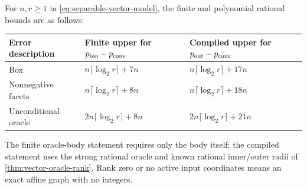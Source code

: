 \begin{theorem}\label{thm:separable-vector-rank}
For $n,r\ge1$ in \eqref{eq:separable-vector-model}, the finite and
polynomial rational bounds are as follows:
\begin{center}
\begin{tabular}{lll}
\toprule
Error description & Finite upper for $p_{\mathrm{bin}}-p_{\mathrm{conv}}$ & Compiled upper for $p_{\mathrm{out}}-p_{\mathrm{conv}}$\\
\midrule
Box & $n\lceil\log_2r\rceil+7n$ & $n\lceil\log_2r\rceil+17n$\\
Nonnegative facets & $n\lceil\log_2r\rceil+8n$ & $n\lceil\log_2r\rceil+18n$\\
Unconditional oracle & $2n\lceil\log_2r\rceil+8n$ & $2n\lceil\log_2r\rceil+21n$\\
\bottomrule
\end{tabular}
\end{center}
The finite oracle-body statement requires only the body itself; the
compiled statement uses the strong rational oracle and known rational
inner/outer radii of \cref{thm:vector-oracle-rank}. Rank zero or no
active input coordinates means an exact affine graph with no integers.
\end{theorem}
